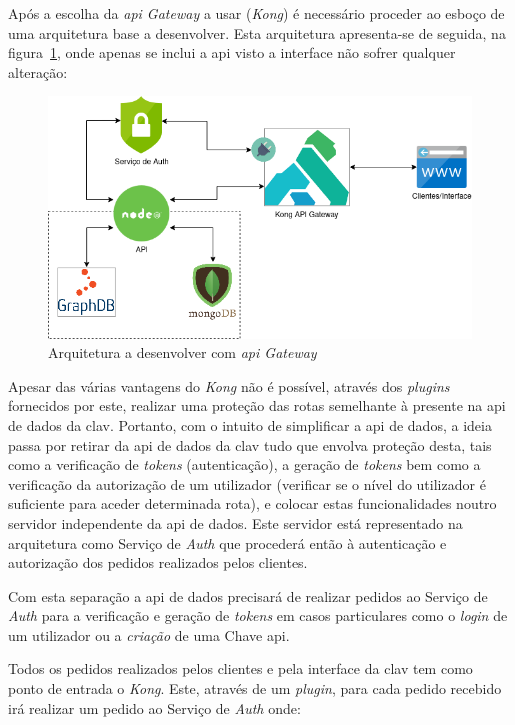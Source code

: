Após a escolha da \textit{\acrshort{api} Gateway} a usar (\textit{Kong}) é necessário proceder ao esboço de uma arquitetura base a desenvolver. Esta arquitetura apresenta-se de seguida, na figura~\ref{fig:apiGatewayArch}, onde apenas se inclui a \acrshort{api} visto a interface não sofrer qualquer alteração:
\begin{figure}[H]
    \centering
    \includegraphics[width=1\textwidth]{img/apiGatewayArch.png}
    \caption{Arquitetura a desenvolver com \textit{\acrshort{api} Gateway}}\label{fig:apiGatewayArch}
\end{figure}

Apesar das várias vantagens do \textit{Kong} não é possível, através dos \textit{plugins} fornecidos por este, realizar uma proteção das rotas semelhante à presente na \acrshort{api} de dados da \acrshort{clav}. Portanto, com o intuito de simplificar a \acrshort{api} de dados, a ideia passa por retirar da \acrshort{api} de dados da \acrshort{clav} tudo que envolva proteção desta, tais como a verificação de \textit{tokens} (autenticação), a geração de \textit{tokens} bem como a verificação da autorização de um utilizador (verificar se o nível do utilizador é suficiente para aceder determinada rota), e colocar estas funcionalidades noutro servidor independente da \acrshort{api} de dados. Este servidor está representado na arquitetura como Serviço de \textit{Auth} que procederá então à autenticação e autorização dos pedidos realizados pelos clientes.

Com esta separação a \acrshort{api} de dados precisará de realizar pedidos ao Serviço de \textit{Auth} para a verificação e geração de \textit{tokens} em casos particulares como o \textit{login} de um utilizador ou a \textit{criação} de uma Chave \acrshort{api}.

Todos os pedidos realizados pelos clientes e pela interface da \acrshort{clav} tem como ponto de entrada o \textit{Kong}. Este, através de um \textit{plugin}, para cada pedido recebido irá realizar um pedido ao Serviço de \textit{Auth} onde:


